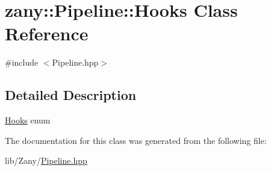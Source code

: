 \hypertarget{classzany_1_1_pipeline_1_1_hooks}{}\section{zany\+:\+:Pipeline\+:\+:Hooks Class Reference}
\label{classzany_1_1_pipeline_1_1_hooks}


{\ttfamily \#include $<$Pipeline.\+hpp$>$}



\subsection{Detailed Description}
\hyperlink{classzany_1_1_pipeline_1_1_hooks}{Hooks} enum 

The documentation for this class was generated from the following file\+:\begin{DoxyCompactItemize}
\item 
lib/\+Zany/\hyperlink{_pipeline_8hpp}{Pipeline.\+hpp}\end{DoxyCompactItemize}
